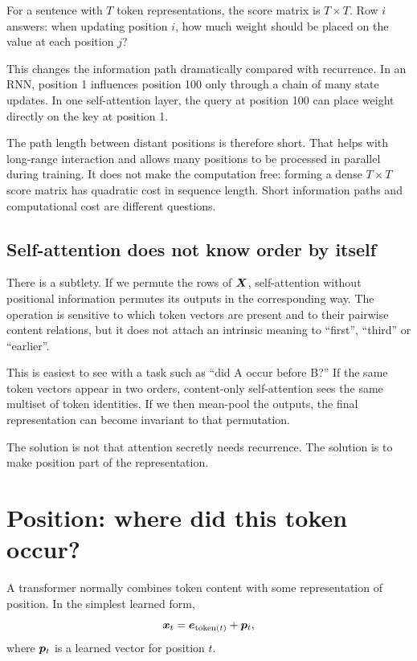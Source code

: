 For a sentence with \(T\) token representations, the score matrix is \(T\times T\). Row \(i\) answers: when updating position \(i\), how much weight should be placed on the value at each position \(j\)?

This changes the information path dramatically compared with recurrence. In an RNN, position 1 influences position 100 only through a chain of many state updates. In one self-attention layer, the query at position 100 can place weight directly on the key at position 1.

The path length between distant positions is therefore short. That helps with long-range interaction and allows many positions to be processed in parallel during training. It does not make the computation free: forming a dense \(T\times T\) score matrix has quadratic cost in sequence length. Short information paths and computational cost are different questions.

\subsection{Self-attention does not know order by itself}

There is a subtlety. If we permute the rows of \(\bm{X}\), self-attention without positional information permutes its outputs in the corresponding way. The operation is sensitive to which token vectors are present and to their pairwise content relations, but it does not attach an intrinsic meaning to ``first'', ``third'' or ``earlier''.

This is easiest to see with a task such as ``did A occur before B?'' If the same token vectors appear in two orders, content-only self-attention sees the same multiset of token identities. If we then mean-pool the outputs, the final representation can become invariant to that permutation.

The solution is not that attention secretly needs recurrence. The solution is to make position part of the representation.

\section{Position: where did this token occur?}

A transformer normally combines token content with some representation of position. In the simplest learned form,
\[
  \bm{x}_t = \bm{e}_{\mathrm{token}(t)} + \bm{p}_t,
\]
where \(\bm{p}_t\) is a learned vector for position \(t\).

